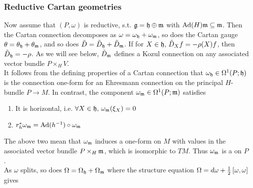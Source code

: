 \documentclass{article}
\begin{document}
\subsubsection{Reductive Cartan geometries}

Now assume that $(P,\omega)$ is reductive, s.t. $\mathfrak{g} = \mathfrak{h} \oplus \mathfrak{m}$ with $\operatorname{Ad}(H)\mathfrak{m} \subseteq \mathfrak{m}$. Then the Cartan connection decomposes as $\omega = \omega_{\mathfrak{h}} + \omega_{\mathfrak{m}}$, so does the Cartan gauge $\theta = \theta_{\mathfrak{h}}+ \theta_{\mathfrak{m}}$, and so does $\tilde{D} = \tilde{D}_{\mathfrak{h}} + \tilde{D}_{\mathfrak{m}}$. If for $X \in \mathfrak{h}, \, \tilde{D}_X f = - \rho(X) f$, then $\tilde{D}_{\mathfrak{h}} = -\rho$. As we will see below, $\tilde{D}_{\mathfrak{m}}$ defines a Kozul connection on any associated vector bundle $P \times_H V$. \\
It follows from the defining properties of a Cartan connection that $\omega_{\mathfrak{h}} \in \Omega^1(P;\mathfrak{h})$ is the connection one-form for an Ehresmann connection on the principal $H$-bundle $P \to M$. In contrast, the component $\omega_{\mathfrak{m}} \in \Omega^1(P;\mathfrak{m})$ satisfies 
\begin{enumerate}
	\item It is horizontal, i.e. $\forall X \in \mathfrak{h}, \, \omega_{\mathfrak{m}}(\xi_X) = 0$
	\item $r_h^\ast \omega_{\mathfrak{m}} = \operatorname{Ad}(h^{-1}) \circ \omega_{\mathfrak{m}}$
\end{enumerate}
The above two mean that $\omega_{\mathfrak{m}}$ induces a one-form on $M$ with values in the associated vector bundle $P \times_H \mathfrak{m}$, which is isomorphic to $TM$. Thus $\omega_{\mathfrak{m}}$ is a  on $P$. \\
As $\omega$ splits, so does $\Omega = \Omega_{\mathfrak{h}} + \Omega_{\mathfrak{m}}$ where the structure equation $\Omega = d\omega + \frac{1}{2}\left[ \omega, \omega \right]$ gives 
\end{document}
